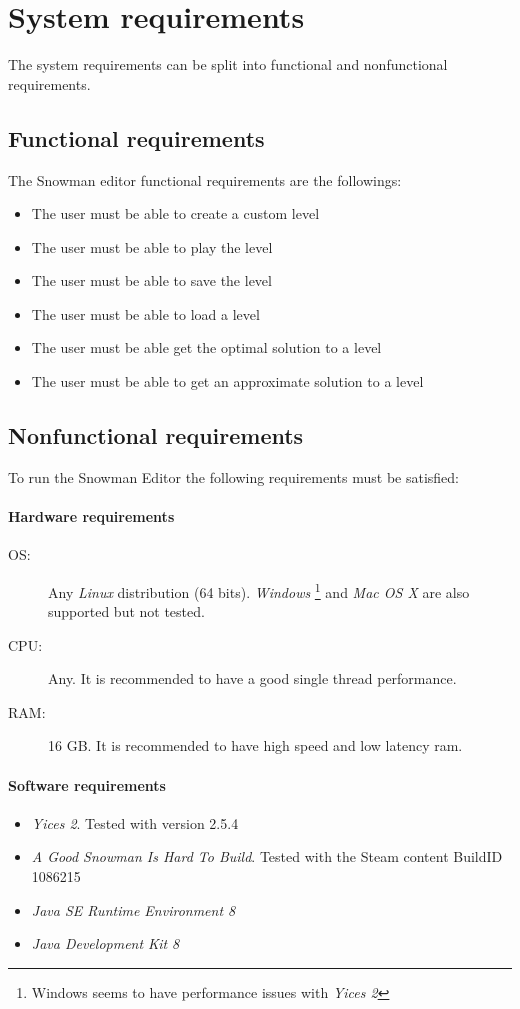 \documentclass{report}
\theoremstyle{plain}
\begin{document}
\chapter{System requirements}
The system requirements can be split into functional and nonfunctional requirements.

\section{Functional requirements}
The Snowman editor functional requirements are the followings:
\begin{itemize}
    \item The user must be able to create a custom level
    \item The user must be able to play the level
    \item The user must be able to save the level
    \item The user must be able to load a level
    \item The user must be able get the optimal solution to a level
    \item The user must be able to get an approximate solution to a level
\end{itemize}

\section{Nonfunctional requirements}
To run the Snowman Editor the following requirements must be satisfied:

\subsubsection{Hardware requirements}
\begin{description}
    \item[OS:] Any \emph{Linux} distribution (64 bits). \emph{Windows} \footnote{Windows seems to have performance issues with \emph{Yices 2}} and \emph{Mac OS X} are also supported but not tested.
    \item[CPU:] Any. It is recommended to have a good single thread performance.
    \item[RAM:] 16 GB. It is recommended to have high speed and low latency ram.
\end{description}

\subsubsection{Software requirements}
\begin{itemize}
    \item \emph{Yices 2}. Tested with version 2.5.4
    \item \emph{A Good Snowman Is Hard To Build}. Tested with the Steam content BuildID 1086215
    \item \emph{Java SE Runtime Environment 8}
    \item \emph{Java Development Kit 8}
\end{itemize}
\end{document}
